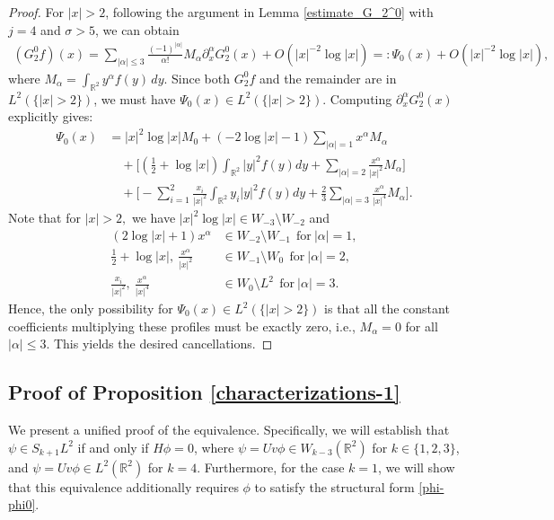\documentclass[reqno]{amsart}
\numberwithin{equation}{section}
\begin{document}
\begin{proof}
	For $|x|>2$, following the argument in Lemma \ref{estimate_G_2^0} with $j=4$ and $\sigma > 5$, we can obtain
	\begin{align*}
		(G_2^0 f)(x) = \sum_{|\alpha| \leq 3} \frac{(-1)^{|\alpha|}}{\alpha!} M_\alpha \partial_x^\alpha G_2^0(x) +  O(|x|^{-2} \log |x|) =: \Psi_0(x) + O(|x|^{-2} \log |x|),
	\end{align*}
where $M_\alpha= \int_{\mathbb{R}^2} y^\alpha f(y) \, dy$.
	Since both $G_2^0 f$ and the remainder are in $L^2(\{ |x| > 2 \})$, we must have $\Psi_0(x) \in L^2(\{ |x| > 2 \})$. Computing $\partial_x^\alpha G_2^0(x)$ explicitly gives:
	\begin{align*}
		\Psi_0(x) &= |x|^2\log|x|M_0+ (-2\log|x|-1)\sum_{|\alpha|=1}x^{\alpha}M_\alpha \\
		&\quad + \Big[(\frac{1}{2}+\log|x|)\int_{\mathbb{R}^2}|y|^2 f(y)dy + \sum_{|\alpha|=2}\frac{x^{\alpha}}{|x|^2}M_\alpha\Big] \\
		&\quad + \Big[-\sum_{i=1}^{2}\frac{x_i}{|x|^2}\int_{\mathbb{R}^2}y_i|y|^2 f(y)dy + \frac{2}{3}\sum_{|\alpha|=3}\frac{x^{\alpha}}{|x|^4}M_\alpha\Big].
	\end{align*}
Note that for $|x|>2,$ we have $|x|^2 \log |x| \in W_{-3} \setminus W_{-2}$ and
\begin{align*}
	(2 \log |x| + 1)x^\alpha &\in W_{-2}\setminus W_{-1} \ \ \text{for}\ |\alpha|=1, \\
	\frac{1}{2} + \log |x|,\  \frac{x^\alpha}{|x|^2}  &\in W_{-1} \setminus W_0 \ \ \text{for}\ |\alpha|=2, \\
	\frac{x_i}{|x|^2}, \  \frac{x^\alpha}{|x|^4}  &\in W_0 \setminus L^2 \ \ \text{for}\ |\alpha|=3.
\end{align*}
	Hence, the only possibility for $\Psi_0(x) \in L^2(\{ |x| > 2 \})$ is that all the constant coefficients multiplying these profiles must be exactly zero, i.e., $M_\alpha = 0$ for all  $|\alpha| \leq 3$. This yields the desired cancellations.  
\end{proof}

\subsection{Proof of Proposition \ref{characterizations-1}}
We present a unified proof of the equivalence. Specifically, we will establish that $\psi \in S_{k+1} L^2$ if and only if $H\phi = 0$, where  $\psi = Uv\phi \in W_{k-3}(\mathbb{R}^2)$ for $k \in \{1, 2, 3\}$, and  $\psi = Uv\phi \in L^2(\mathbb{R}^2)$ for $k = 4$. Furthermore, for the  case $k=1$, we will show that this equivalence additionally requires $\phi$ to satisfy the structural form \eqref{phi-phi0}.
\end{document}
